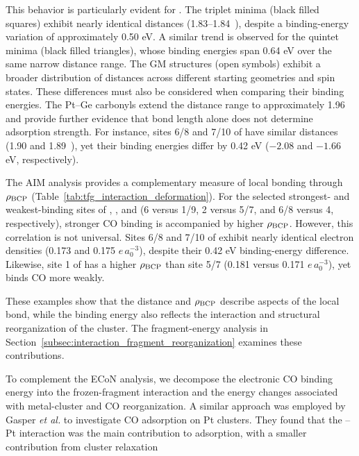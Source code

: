 This behavior is particularly evident for . The triplet minima (black filled squares) exhibit nearly identical  distances (1.83--1.84~\si{\angstromunit}), despite a binding-energy variation of approximately 0.50 eV. A similar trend is observed for the quintet minima (black filled triangles), whose binding energies span 0.64 eV over the same narrow distance range. The GM structures (open symbols) exhibit a broader distribution of  distances {across different starting geometries and spin states. These differences must also be considered when comparing their binding energies}. The Pt–Ge carbonyls extend the distance range to approximately 1.96~\si{\angstromunit} and provide further evidence that bond length alone does not determine adsorption strength. For instance, sites 6/8 and 7/10 of  have similar  distances (1.90 and 1.89~\si{\angstromunit}), yet their binding energies differ by 0.42 eV ($-2.08$ and $-1.66$ eV, respectively).

The AIM analysis provides a complementary measure of local  bonding through $\rho_{\rm BCP}$ (Table~\ref{tab:tfg_interaction_deformation}). For the selected strongest- and weakest-binding sites of , , and  (6 versus 1/9, 2 versus 5/7, and 6/8 versus 4, respectively), stronger CO binding is accompanied by higher $\rho_{\rm BCP}$. However, this correlation is not universal. Sites 6/8 and 7/10 of  exhibit nearly identical electron densities (0.173 and 0.175 $e\,a_0^{-3}$), despite their 0.42 eV binding-energy difference. Likewise, site 1 of  has a higher $\rho_{\rm BCP}$ than site 5/7 (0.181 versus 0.171 {$e\,a_0^{-3}$}), yet binds CO more weakly.

These examples show that the  distance and $\rho_{\rm BCP}$ describe aspects of the local bond, while the binding energy also reflects the interaction and structural reorganization of the cluster. The fragment-energy analysis in Section~\ref{subsec:interaction_fragment_reorganization} examines these contributions.



To complement the ECoN analysis, we decompose the electronic CO binding energy
into the frozen-fragment interaction and the energy changes associated with
metal-cluster and CO reorganization. A similar approach was employed by Gasper
\textit{et al.} to investigate CO adsorption on Pt clusters. They found that the --Pt interaction was the
main contribution to adsorption, with a smaller contribution from
cluster relaxation\cite{gasper:2017}

